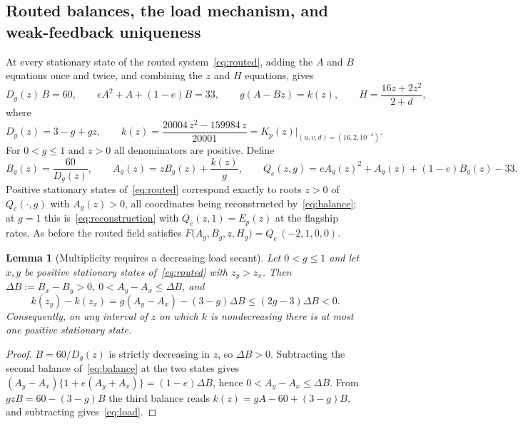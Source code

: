 \documentclass[11pt,a4paper]{article}
\theoremstyle{plain}
\newtheorem{lemma}[theorem]{Lemma}
\theoremstyle{definition}
\theoremstyle{remark}
\begin{document}
\subsection{Routed balances, the load mechanism, and weak-feedback uniqueness}

At every stationary state of the routed system~\eqref{eq:routed}, adding the $A$ and $B$ equations once and twice, and combining the $z$ and $H$ equations, gives
\begin{equation}\label{eq:balance}
D_g(z)\,B=60,\qquad eA^2+A+(1-e)B=33,\qquad g(A-Bz)=k(z),\qquad H=\frac{16z+2z^2}{2+d},
\end{equation}
where
\begin{equation}\label{eq:Dk}
D_g(z)=3-g+gz,\qquad k(z)=\frac{20004\,z^2-159984\,z}{20001}=K_p(z)\big|_{(u,v,d)=(16,2,10^{-4})}.
\end{equation}
For $0<g\le1$ and $z>0$ all denominators are positive. Define
\begin{equation}\label{eq:Q}
B_g(z)=\frac{60}{D_g(z)},\qquad A_g(z)=zB_g(z)+\frac{k(z)}{g},\qquad Q_e(z,g)=eA_g(z)^2+A_g(z)+(1-e)B_g(z)-33 .
\end{equation}
Positive stationary states of~\eqref{eq:routed} correspond exactly to roots $z>0$ of $Q_e(\cdot,g)$ with $A_g(z)>0$, all coordinates being reconstructed by~\eqref{eq:balance}; at $g=1$ this is~\eqref{eq:reconstruction} with $Q_e(z,1)=E_p(z)$ at the flagship rates. As before the routed field satisfies $F\bigl(A_g,B_g,z,H_g\bigr)=Q_e\,(-2,1,0,0)$.

\begin{lemma}[Multiplicity requires a decreasing load secant]\label{lem:load}
Let $0<g\le1$ and let $x,y$ be positive stationary states of~\eqref{eq:routed} with $z_y>z_x$. Then $\Delta B:=B_x-B_y>0$, $0<A_y-A_x\le\Delta B$, and
\begin{equation}\label{eq:load}
k(z_y)-k(z_x)=g(A_y-A_x)-(3-g)\Delta B\le(2g-3)\Delta B<0 .
\end{equation}
Consequently, on any interval of $z$ on which $k$ is nondecreasing there is at most one positive stationary state.
\end{lemma}
\begin{proof}
$B=60/D_g(z)$ is strictly decreasing in $z$, so $\Delta B>0$. Subtracting the second balance of~\eqref{eq:balance} at the two states gives $(A_y-A_x)\{1+e(A_y+A_x)\}=(1-e)\Delta B$, hence $0<A_y-A_x\le\Delta B$. From $gzB=60-(3-g)B$ the third balance reads $k(z)=gA-60+(3-g)B$, and subtracting gives~\eqref{eq:load}.
\end{proof}
\end{document}
